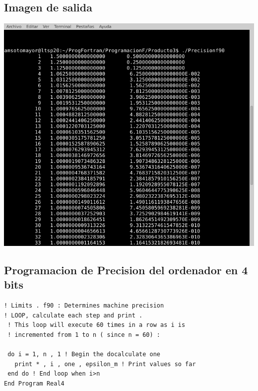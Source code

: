 \documentclass[letterpaper,10pt,twoside,onecolumn]{article}
\begin{document}
\subsection{Imagen de salida}
\includegraphics[scale=.75]{Precision.png}

\subsection{Programacion de Precision del ordenador en 4 bits}
\begin{verbatim}
! Limits . f90 : Determines machine precision
! LOOP, calculate each step and print .
 ! This loop will execute 60 times in a row as i is
 ! incremented from 1 to n ( since n = 60) :

 do i = 1, n , 1 ! Begin the docalculate one
   print * , i , one , epsilon_m ! Print values so far
 end do ! End loop when i>n
End Program Real4 
\end{verbatim}
\end{document}

